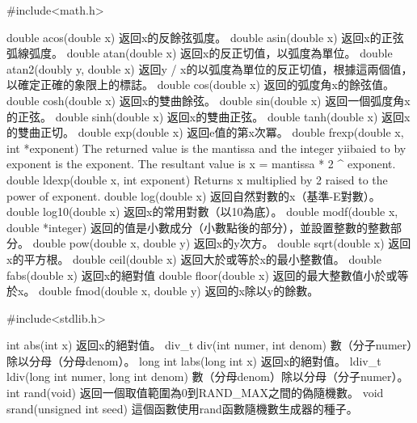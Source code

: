 #include<math.h>

double acos(double x) 返回x的反餘弦弧度。
double asin(double x) 返回x的正弦弧線弧度。
double atan(double x) 返回x的反正切值，以弧度為單位。
double atan2(doubly y, double x) 返回y / x的以弧度為單位的反正切值，根據這兩個值，以確定正確的象限上的標誌。
double cos(double x) 返回的弧度角x的餘弦值。
double cosh(double x) 返回x的雙曲餘弦。
double sin(double x) 返回一個弧度角x的正弦。
double sinh(double x) 返回x的雙曲正弦。
double tanh(double x) 返回x的雙曲正切。
double exp(double x) 返回e值的第x次冪。
double frexp(double x, int *exponent)
The returned value is the mantissa and the integer yiibaied to by exponent is the exponent. The resultant value is x = mantissa * 2 ^ exponent.
double ldexp(double x, int exponent)
Returns x multiplied by 2 raised to the power of exponent.
double log(double x) 返回自然對數的x（基準-E對數）。
double log10(double x) 返回x的常用對數（以10為底）。
double modf(double x, double *integer) 返回的值是小數成分（小數點後的部分），並設置整數的整數部分。
double pow(double x, double y) 返回x的y次方。
double sqrt(double x) 返回x的平方根。
double ceil(double x) 返回大於或等於x的最小整數值。
double fabs(double x) 返回x的絕對值
double floor(double x) 返回的最大整數值小於或等於x。
double fmod(double x, double y) 返回的x除以y的餘數。

#include<stdlib.h>

int abs(int x) 返回x的絕對值。
div_t div(int numer, int denom) 數（分子numer）除以分母（分母denom）。
long int labs(long int x) 返回x的絕對值。
ldiv_t ldiv(long int numer, long int denom) 數（分母denom）除以分母（分子numer）。
int rand(void) 返回一個取值範圍為0到RAND_MAX之間的偽隨機數。
void srand(unsigned int seed) 這個函數使用rand函數隨機數生成器的種子。